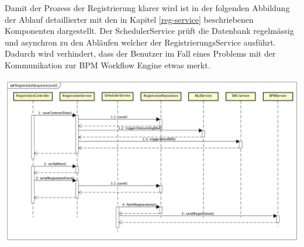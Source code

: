 Damit der Prozess der Registrierung klarer wird ist in der folgenden Abbildung der Ablauf detaillierter mit den in Kapitel \ref{reg-service} beschriebenen Komponenten dargestellt. Der SchedulerService prüft die Datenbank regelmässig und asynchron zu den Abläufen welcher der RegistrierungsService ausführt. Dadurch wird verhindert, dass der Benutzer im Fall eines Problems mit der Kommunikation zur BPM Workflow Engine etwas merkt.

\begin{center}
	\includegraphics[scale=0.42]{RegistrationSequenceLevel2.png}
\end{center}



